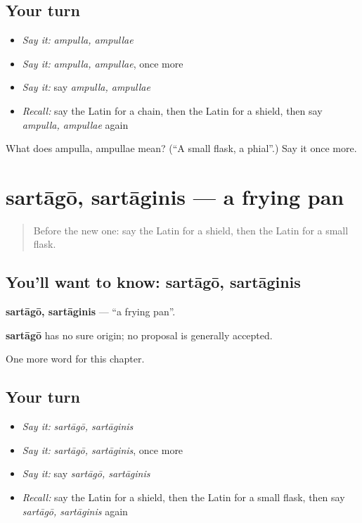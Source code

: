\subsection*{Your turn}
\begin{itemize}
\raggedright
  \item \emph{Say it:} \emph{ampulla, ampullae}
  \item \emph{Say it:} \emph{ampulla, ampullae}, once more
  \item \emph{Say it:} say \emph{ampulla, ampullae}
  \item \emph{Recall:} say the Latin for a chain, then the Latin for a shield, then say \emph{ampulla, ampullae} again
\end{itemize}

\begin{tcolorbox}[breakable,colback=teal!4,colframe=teal!35!black,title={Before you move on}]
What does ampulla, ampullae mean? (\textquotedblleft{}A small flask, a phial\textquotedblright{}.) Say it once more.
\end{tcolorbox}
\section[sartāgō, sartāginis]{sartāgō, sartāginis — a frying pan}

\label{lesson:LA-C252-sartago}



\begin{quote}
Before the new one: say the Latin for a shield, then the Latin for a small flask.
\end{quote}

\subsection*{You'll want to know: sartāgō, sartāginis}
\textbf{sartāgō, sartāginis} — \textquotedblleft{}a frying pan\textquotedblright{}.

\begin{cousinweb}
\textbf{sartāgō} has no sure origin; no proposal is generally accepted.
\end{cousinweb}

\begin{grammarlens}[title={What you've built}]
One more word for this chapter.
\end{grammarlens}

\subsection*{Your turn}
\begin{itemize}
\raggedright
  \item \emph{Say it:} \emph{sartāgō, sartāginis}
  \item \emph{Say it:} \emph{sartāgō, sartāginis}, once more
  \item \emph{Say it:} say \emph{sartāgō, sartāginis}
  \item \emph{Recall:} say the Latin for a shield, then the Latin for a small flask, then say \emph{sartāgō, sartāginis} again
\end{itemize}

